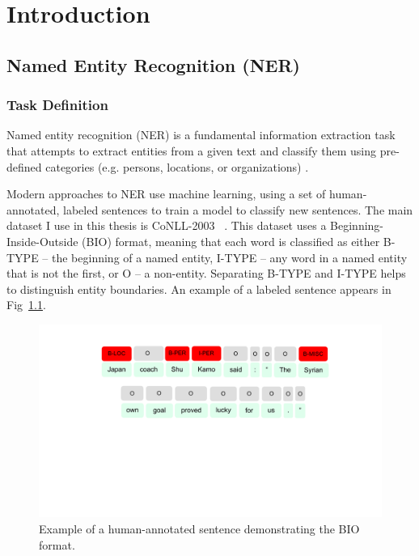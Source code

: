 \addchapheadtotoc
\chapter{Introduction}
\section{Named Entity Recognition (NER)}
\subsection{Task Definition}
Named entity recognition (NER) is a fundamental information extraction task that attempts to extract entities from a given text and classify them using pre-defined categories (e.g. persons, locations, or organizations) \citep{2007Survey}. 

Modern approaches to NER use machine learning, using a set of human-annotated, labeled sentences to train a model to classify new sentences. The main dataset I use in this thesis is CoNLL-2003 ~\citep{conll}. This dataset uses a Beginning-Inside-Outside (BIO) format, meaning that each word is classified as either \textsc{B-TYPE} -- the beginning of a named entity, \textsc{I-TYPE} -- any word in a named entity that is not the first, or \textsc{O} -- a non-entity. Separating \textsc{B-TYPE} and \textsc{I-TYPE} helps to distinguish entity boundaries. An example of a labeled sentence appears in Fig~\ref{fig:labeledsent}.

\begin{figure}[h]
	\centering
	\includegraphics[width=0.85\linewidth]{LatexDiss/figures/labeledsent.pdf} 
	\caption{Example of a human-annotated sentence demonstrating the BIO format.}
	\label{fig:labeledsent}
\end{figure}

